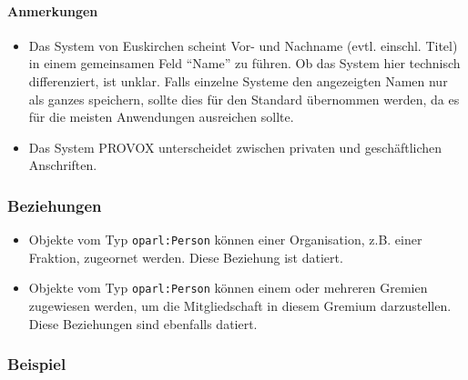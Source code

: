 \documentclass[,a4paper]{article}
\begin{document}
\paragraph{Anmerkungen}

\begin{itemize}
\item
  Das System von Euskirchen scheint Vor- und Nachname (evtl. einschl.
  Titel) in einem gemeinsamen Feld ``Name'' zu führen. Ob das System
  hier technisch differenziert, ist unklar. Falls einzelne Systeme den
  angezeigten Namen nur als ganzes speichern, sollte dies für den
  Standard übernommen werden, da es für die meisten Anwendungen
  ausreichen sollte.
\item
  Das System PROVOX unterscheidet zwischen privaten und geschäftlichen
  Anschriften.
\end{itemize}

\subsubsection{Beziehungen}

\begin{itemize}
\item
  Objekte vom Typ \texttt{oparl:Person} können einer Organisation, z.B.
  einer Fraktion, zugeornet werden. Diese Beziehung ist datiert.
\item
  Objekte vom Typ \texttt{oparl:Person} können einem oder mehreren
  Gremien zugewiesen werden, um die Mitgliedschaft in diesem Gremium
  darzustellen. Diese Beziehungen sind ebenfalls datiert.
\end{itemize}

\subsubsection{Beispiel}
\end{document}
